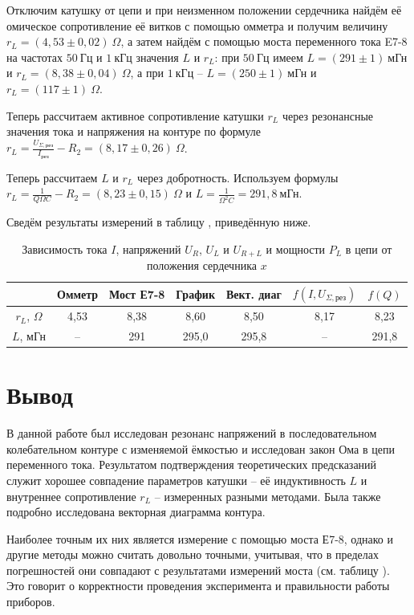 \documentclass[a4paper,10pt]{article}
\begin{document}
Отключим катушку от цепи и при неизменном положении сердечника найдём её омическое сопротивление её витков с помощью омметра и получим величину $r_{L}=(4,53\pm0,02)~\Omega$, а затем найдём с помощью моста переменного тока E7-8 на частотах $50~\text{Гц}$ и $1~\text{кГц}$ значения $L$ и $r_L$: при $50~\text{Гц}$ имеем $L=(291\pm1)~\text{мГн}$ и $r_L=(8,38\pm0,04)~\Omega$, а при $1~\text{кГц}$ -- $L=(250\pm1)~\text{мГн}$ и $r_L=(117\pm1)~\Omega$.

Теперь рассчитаем активное сопротивление катушки $r_L$ через резонансные значения тока и напряжения на контуре по формуле $r_L=\frac{U_{\Sigma,\text{рез}}}{I_{\text{рез}}}-R_2=\left(8,17\pm0,26\right)~\Omega$.

Теперь рассчитаем $L$ и $r_L$ через добротность. Используем формулы $r_L=\frac{1}{Q\Omega C}-R_2=\left(8,23\pm0,15\right)~\Omega$ и $L=\frac{1}{\Omega^2C}=291,8~\text{мГн}$.

Сведём результаты измерений в таблицу , приведённую ниже.

\begin{table}[h]
	\centering
	\caption{Зависимость тока $I$, напряжений $U_R$, $U_L$ и $U_{R+L}$ и мощности $P_L$ в цепи от положения сердечника $x$} \label{final}
	\begin{tabular}{|c|c|c|c|c|c|c|}
		\hline
		 & Омметр & Мост Е7-8 & График & Вект. диаг & $f\left(I,U_{\Sigma,\text{рез}}\right)$ & $f\left(Q\right)$ \\ \hline
		\hline
		$r_L$, $\Omega$ & 4,53 & 8,38 & 8,60 & 8,50 & 8,17 & 8,23 \\ \hline
		$L$, мГн & -- & 291 & 295,0 & 295,8 & -- & 291,8 \\ \hline
	\end{tabular}
\end{table}

\section*{Вывод}

В данной работе был исследован резонанс напряжений в последовательном колебательном контуре с изменяемой ёмкостью и исследован закон Ома в цепи переменного тока. Результатом подтверждения теоретических предсказаний служит хорошее совпадение параметров катушки -- её индуктивность $L$ и внутреннее сопротивление $r_L$ -- измеренных разными методами. Была также подробно исследована векторная диаграмма контура.

Наиболее точным их них является измерение с помощью моста Е7-8, однако и другие методы можно считать довольно точными, учитывая, что в пределах погрешностей они совпадают с результатами измерений моста (см. таблицу ). Это говорит о корректности проведения эксперимента и правильности работы приборов.
\end{document}
